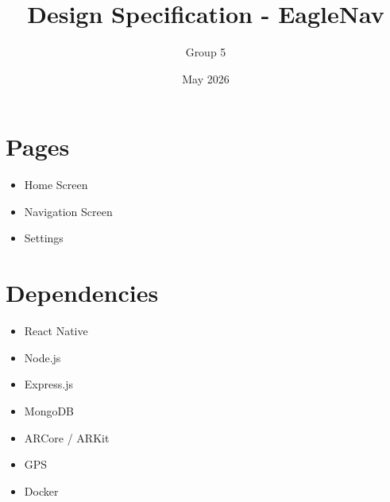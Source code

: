 \documentclass{article}
\title{Design Specification - EagleNav}
\author{Group 5}
\date{May 2026}
\begin{document}
\maketitle

\section{Pages}
\begin{itemize}
\item Home Screen
\item Navigation Screen
\item Settings
\end{itemize}

\section{Dependencies}
\begin{itemize}
\item React Native
\item Node.js
\item Express.js
\item MongoDB
\item ARCore / ARKit
\item GPS
\item Docker
\end{itemize}
\end{document}
